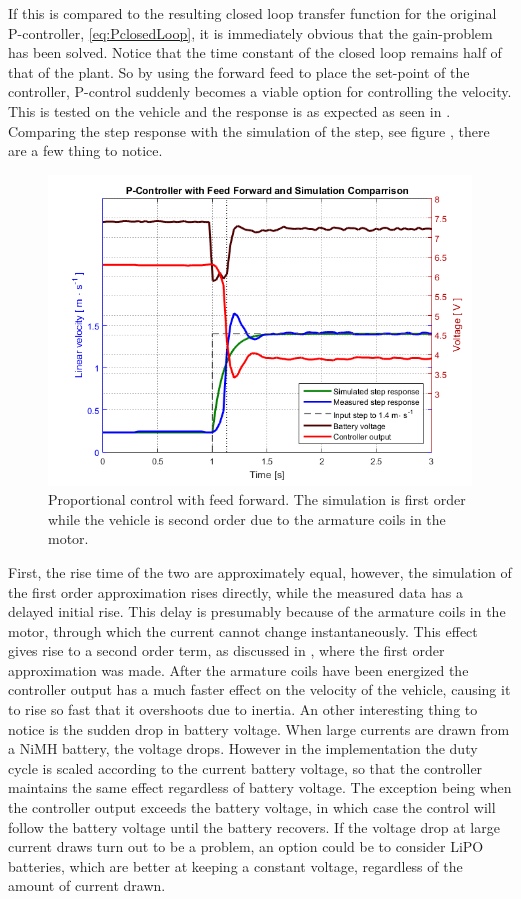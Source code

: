 %
If this is compared to the resulting closed loop transfer function for the original P-controller, \eqref{eq:PclosedLoop}, it is immediately obvious that the gain-problem has been solved. Notice that the time constant of the closed loop remains half of that of the plant. So by using the forward feed to place the set-point of the controller, P-control suddenly becomes a viable option for controlling the velocity. This is tested on the vehicle and the response is as expected as seen in . Comparing the step response with the simulation of the step, see figure , there are a few thing to notice.
%
\begin{figure}[H]
 	\centering
 	\includegraphics[width=\textwidth]{figures/stepPfeedForward}
 	\caption{Proportional control with feed forward. The simulation is first order while the vehicle is second order due to the armature coils in the motor.}
 	\label{fig:stepPfeedForward}
\end{figure}
%
First, the rise time of the two are approximately equal, however, the simulation of the first order approximation rises directly, while the measured data has a delayed initial rise. This delay is presumably because of the armature coils in the motor, through which the current cannot change instantaneously. This effect gives rise to a second order term, as discussed in , where the first order approximation was made. After the armature coils have been energized the controller output has a much faster effect on the velocity of the vehicle, causing it to rise so fast that it overshoots due to inertia.
An other interesting thing to notice is the sudden drop in battery voltage. When large currents are drawn from a NiMH battery, the voltage drops\cite{BatteryDS}. However in the implementation the duty cycle is scaled according to the current battery voltage, so that the controller maintains the same effect regardless of battery voltage. The exception being when the controller output exceeds the battery voltage, in which case the control will follow the battery voltage until the battery recovers. If the voltage drop at large current draws turn out to be a problem, an option could be to consider LiPO batteries, which are better at keeping a constant voltage, regardless of the amount of current drawn.

